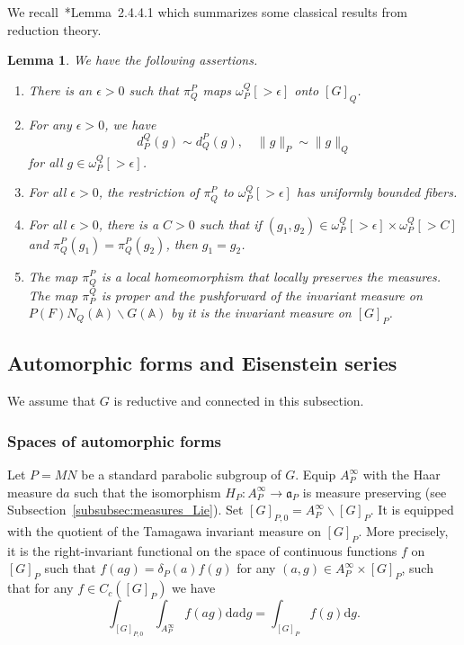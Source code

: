 \documentclass[letterpaper,11pt]{amsart}
\newcommand{\fa}{\mathfrak{a}}
\newcommand{\bA}{\mathbb{A}}
\newcommand{\rd}{\mathrm{d}}
\newcommand{\bs}{\backslash}
\newcommand{\<}{\negthickspace}
\providecommand{\aabs}[1]{\lVert#1\rVert}
\theoremstyle{definition}
\theoremstyle{plain}
\newtheorem{lemma}[definition]{Lemma}
\theoremstyle{remark}
\numberwithin{equation}{section}
\begin{document}
We recall~\cite{BPCZ}*{Lemma~2.4.4.1} which summarizes some classical results
from reduction theory.

\begin{lemma}   \label{lemma:classical_reduction_theory}
We have the following assertions.
\begin{enumerate}
\item There is an $\epsilon>0$ such that $\pi_Q^P$ maps
    $\omega_P^Q[>\epsilon]$ onto $[G]_Q$.

\item For any $\epsilon>0$, we have
    \[
    d_P^Q(g) \sim d_Q^P(g), \quad \aabs{g}_P \sim \aabs{g}_Q
    \]
    for all $g \in \omega_P^Q[>\epsilon]$.

\item For all $\epsilon>0$, the restriction of $\pi_Q^P$ to
    $\omega_P^Q[>\epsilon]$ has uniformly bounded fibers.

\item For all $\epsilon>0$, there is a $C>0$ such that if $(g_1, g_2) \in
    \omega_P^Q[>\epsilon] \times \omega_P^Q[>C]$ and $\pi_Q^P(g_1) =
    \pi_Q^P(g_2)$, then $g_1 = g_2$.

\item The map $\pi_Q^P$ is a local homeomorphism that locally preserves the
    measures. The map $\pi_P^Q$ is proper and the pushforward of the
    invariant measure on $P(F) N_Q(\bA) \bs G(\bA)$ by it is the
    invariant measure on $[G]_P$.
\end{enumerate}
\end{lemma}



\subsection{Automorphic forms and Eisenstein series}
\label{subsec:automorphic_form}

We assume that $G$ is reductive and connected in this subsection.

\subsubsection{Spaces of automorphic forms}
Let $P = MN$ be a standard parabolic subgroup of $G$. Equip $A_P^\infty$ with the Haar measure $\rd a$ such that the isomorphism $H_P: A_P^\infty \to \fa_P$ is measure preserving (see Subsection~\ref{subsubsec:measures_Lie}). Set $[G]_{P,0}=A_P^{\infty} \backslash [G]_P$. It is equipped with the quotient of the Tamagawa invariant measure on $[G]_P$. More precisely, it is the right-invariant functional on the space of continuous functions $f$ on $[G]_P$ such that $f(ag)=\delta_P(a)f(g)$ for any $(a,g) \in A_P^{\infty} \times [G]_P$, such that for any $f \in C_c([G]_P)$ we have
\begin{equation*}
  \int_{[G]_{P,0}}  \int_{A_P^{\infty}} f(ag) \rd a \rd g = \int_{[G]_P} f(g) \rd g.
\end{equation*}
\end{document}
